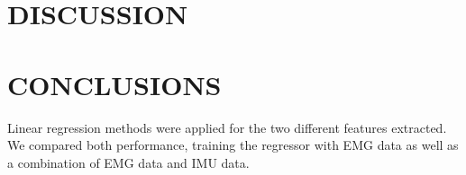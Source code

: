\documentclass[a4paper, 10pt, conference]{ieeeconf}      %
\begin{document}


	\section{DISCUSSION}
	
	
	
	


	
	
	
	\section{CONCLUSIONS}
	
 Linear regression methods were applied for the two different features extracted. We compared both performance, training the regressor with EMG data as well as a combination of EMG data and IMU data.
	
	\addtolength{\textheight}{-12cm}   %
	
\end{document}
